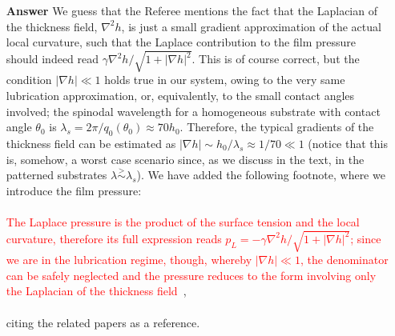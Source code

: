 \documentclass[12pt,english]{article}
\begin{document}
\begin{itemize}
\item[ \textbf{{Answer}}]
{
We guess that the Referee mentions the fact that the Laplacian of the thickness field, $\nabla^2 h$,
is just a small gradient approximation of the actual local curvature, such that the Laplace contribution to the film pressure should indeed read $\gamma \nabla^2 h/\sqrt{1+|\nabla h|^2}$. This is of course correct, but 
the condition $|\nabla h| \ll 1$ holds true in our system, owing to the very same lubrication approximation,
or, equivalently, to the small contact angles involved; the spinodal wavelength for a homogeneous substrate with
contact angle $\theta_0$ is $\lambda_s = 2\pi/q_0(\theta_0) \approx 70 h_0$. Therefore, the typical gradients
of the thickness field can be estimated as $|\nabla h| \sim h_0/\lambda_s \approx 1/70 \ll 1$ (notice 
that this is, somehow, a worst case scenario since, as we discuss in the text, in the patterned substrates
$\lambda \stackrel{>}{\sim} \lambda_s$).
We have added the following footnote, where we introduce the film pressure:\\
\\
\textcolor{red}{The Laplace pressure is the product of the surface tension 
and the local curvature, therefore its full expression reads $p_L = -\gamma \nabla^2 h/\sqrt{1+|\nabla h|^2}$; 
since we are in the lubrication regime, though, whereby $|\nabla h| \ll 1$, the denominator can be safely neglected 
and the pressure reduces to the form involving only the Laplacian of the thickness field~\cite{Benet2014,alizadeh_pahlavan_cueto-felgueroso_hosoi_mckinley_juanes_2018}}, \\
\\
citing the related papers as a reference.
}
\end{itemize}




\end{document}
